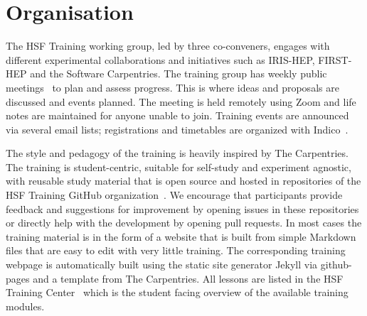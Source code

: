 \documentclass[twocolumn]{svjour3}          %
\begin{document}
\section{Organisation }\label{sec:Organisation}
%
The HSF Training working group, led by three co-conveners, engages with different experimental collaborations and initiatives such as IRIS-HEP, FIRST-HEP and the Software Carpentries. The training group has weekly public meetings~\cite{HSF-training-meetings} to plan and assess progress. This is where ideas and proposals are discussed and events planned. The meeting is held remotely using Zoom  and life notes are maintained for anyone unable to join. Training events are announced via several email lists; registrations and timetables are organized with  Indico~\cite{HSF-training-events}. 

The style and pedagogy of the training is heavily inspired by The Carpentries.
The training is student-centric, suitable for self-study and experiment agnostic, with reusable study material that is open source and hosted in repositories of the HSF Training GitHub organization~\cite{HSF-training-materials}. We encourage that participants provide feedback and suggestions for improvement by opening issues in these repositories or directly help with the development by opening pull requests. 
In most cases the training material is in the form of a website that is built from simple Markdown files that are easy to edit with very little training. The corresponding training webpage is automatically built using the static site generator Jekyll via github-pages and a template from The Carpentries.
All lessons are listed in the HSF Training Center~\cite{HSF-curriculum} which is the student facing overview of the available training modules. 
\end{document}
